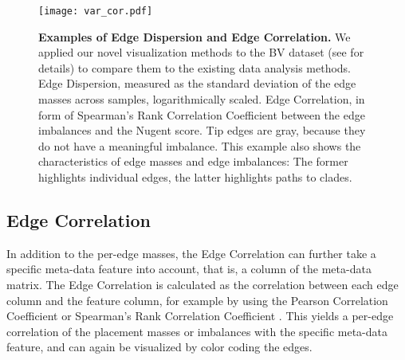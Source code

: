 \begin{figure}[!ht]
    \centering
    \texttt{[image: var\_cor.pdf]}
    \begin{subfigure}{0pt}
        \label{fig:var_cor:sub:em_varl}
    \end{subfigure}
    \begin{subfigure}{0pt}
        \label{fig:var_cor:sub:ei_var}
    \end{subfigure}
    \caption[Examples of Edge Dispersion and Edge Correlation]{
        \textbf{Examples of Edge Dispersion and Edge Correlation.}
        We applied our novel visualization methods to the \acf{BV} dataset
        (see  for details)
        to compare them to the existing data analysis methods.
        Edge Dispersion, measured as the standard deviation of the edge masses across samples, logarithmically scaled.
        Edge Correlation, in form of Spearman's Rank Correlation Coefficient
        between the edge imbalances and the Nugent score.
        Tip edges are gray, because they do not have a meaningful imbalance.
        This example also shows the characteristics of edge masses and edge imbalances:
        The former highlights individual edges, the latter highlights paths to clades.
    }
    \label{fig:var_cor}
\end{figure}


\subsection{Edge Correlation}
\label{ch:Visualization:sec:Methods:sub:EdgeCorrelation}

In addition to the per-edge masses, the Edge Correlation can further
take a specific meta-data feature into account, that is, a column of the meta-data matrix.
The Edge Correlation is calculated as the correlation between each edge column and the feature column,
for example by using the Pearson Correlation Coefficient or Spearman's Rank Correlation Coefficient \cite{Everitt2010}.
This yields a per-edge correlation of the placement masses or imbalances with the specific meta-data feature,
and can again be visualized by color coding the edges.


